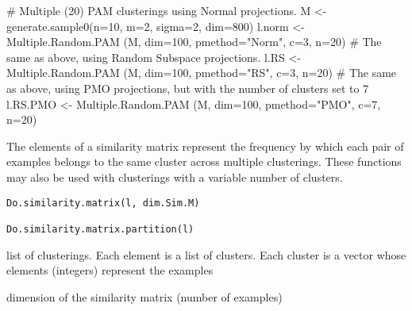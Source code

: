 \documentclass{article}
\begin{document}
\begin{Examples}
\begin{ExampleCode}
# Multiple (20) PAM clusterings using Normal projections. 
M <- generate.sample0(n=10, m=2, sigma=2, dim=800)
l.norm <- Multiple.Random.PAM (M, dim=100, pmethod="Norm", c=3, n=20)
# The same as above, using Random Subspace projections.
l.RS <-  Multiple.Random.PAM (M, dim=100, pmethod="RS", c=3,  n=20)
# The same as above, using PMO projections, but with the number of clusters set to 7
l.RS.PMO <-  Multiple.Random.PAM (M, dim=100, pmethod="PMO", c=7, n=20)
\end{ExampleCode}
\end{Examples}

\begin{Description}\relax
The elements of a similarity matrix represent the frequency by which each pair of examples belongs to the same 
cluster across multiple clusterings.
These functions may also be used  with clusterings with a variable number of clusters.
\end{Description}
\begin{Usage}
\begin{verbatim}
Do.similarity.matrix(l, dim.Sim.M)

Do.similarity.matrix.partition(l)
\end{verbatim}
\end{Usage}
\begin{Arguments}
\begin{ldescription}
\item[\code{l}] list of clusterings. Each element is a list of clusters. Each cluster is a vector whose elements (integers)
represent the examples
\item[\code{dim.Sim.M}] dimension of the similarity matrix (number of examples) 
\end{ldescription}
\end{Arguments}
\end{document}
